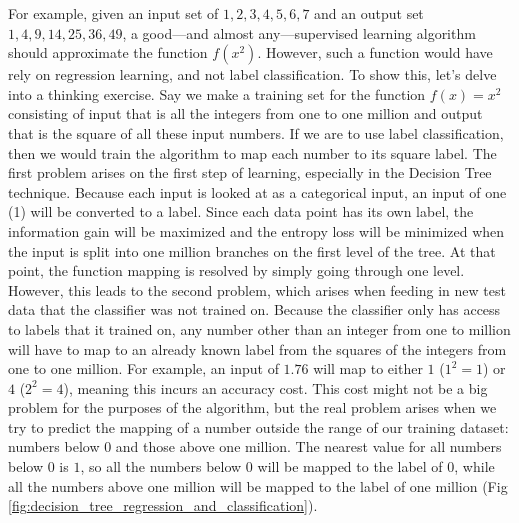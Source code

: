 For example, given an input set of ${1,2,3,4,5,6,7}$ and an output set ${1,4,9,14,25,36,49}$, a good---and almost any---supervised learning algorithm should approximate the function $f(x^2)$. However, such a function would have rely on regression learning, and not label classification. To show this, let's delve into a thinking exercise. Say we make a training set for the function $f(x) = x^2$ consisting of input that is all the integers from one to one million and output that is the square of all these input numbers. If we are to use label classification, then we would train the algorithm to map each number to its square label. The first problem arises on the first step of learning, especially in the Decision Tree technique. Because each input is looked at as a categorical input, an input of one (1) will be converted to a label. Since each data point has its own label, the information gain will be maximized and the entropy loss will be minimized when the input is split into one million branches on the first level of the tree. At that point, the function mapping is resolved by simply going through one level. However, this leads to the second problem, which arises when feeding in new test data that the classifier was not trained on. Because the classifier only has access to labels that it trained on, any number other than an integer from one to million will have to map to an already known label from the squares of the integers from one to one million. For example, an input of $1.76$ will map to either $1$ ($1^2=1$) or $4$ ($2^2 = 4$), meaning this incurs an accuracy cost. This cost might not be a big problem for the purposes of the algorithm, but the real problem arises when we try to predict the mapping of a number outside the range of our training dataset: numbers below 0 and those above one million. The nearest value for all numbers below 0 is $1$, so all the numbers below 0 will be mapped to the label of $0$, while all the numbers above one million will be mapped to the label of one million (Fig \ref{fig:decision_tree_regression_and_classification}).

